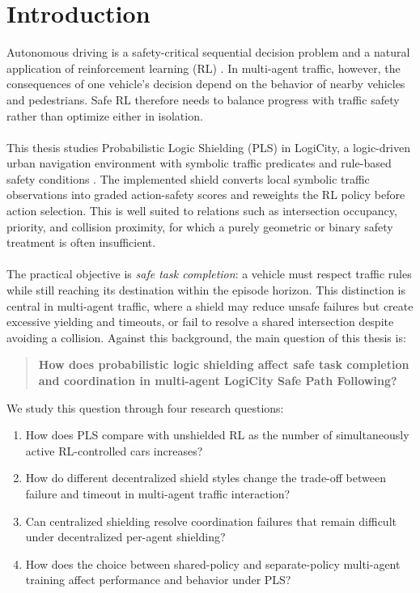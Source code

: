 \chapter{Introduction}
\label{cha:intro}

Autonomous driving is a safety-critical sequential decision problem and a natural application of reinforcement learning (RL) \cite{kiran2021deepreinforcementlearningautonomous,isele2019safereinforcementlearningautonomous}. In multi-agent traffic, however, the consequences of one vehicle's decision depend on the behavior of nearby vehicles and pedestrians. Safe RL therefore needs to balance progress with traffic safety rather than optimize either in isolation.
\\
\\
This thesis studies Probabilistic Logic Shielding (PLS) in LogiCity, a logic-driven urban navigation environment with symbolic traffic predicates and rule-based safety conditions \cite{li2025logicityadvancingneurosymbolicai,yang2023safereinforcementlearningprobabilistic}. The implemented shield converts local symbolic traffic observations into graded action-safety scores and reweights the RL policy before action selection. This is well suited to relations such as intersection occupancy, priority, and collision proximity, for which a purely geometric or binary safety treatment is often insufficient.
\\
\\
The practical objective is \emph{safe task completion}: a vehicle must respect traffic rules while still reaching its destination within the episode horizon. This distinction is central in multi-agent traffic, where a shield may reduce unsafe failures but create excessive yielding and timeouts, or fail to resolve a shared intersection despite avoiding a collision.
Against this background, the main question of this thesis is:

\begin{quote}
\textbf{How does probabilistic logic shielding affect safe task completion and coordination in multi-agent LogiCity Safe Path Following?}
\end{quote}

\noindent We study this question through four research questions:

\begin{enumerate}
    \item How does PLS compare with unshielded RL as the number of simultaneously active RL-controlled cars increases?
    \item How do different decentralized shield styles change the trade-off between failure and timeout in multi-agent traffic interaction?
    \item Can centralized shielding resolve coordination failures that remain difficult under decentralized per-agent shielding?
    \item How does the choice between shared-policy and separate-policy multi-agent training affect performance and behavior under PLS?
\end{enumerate}

